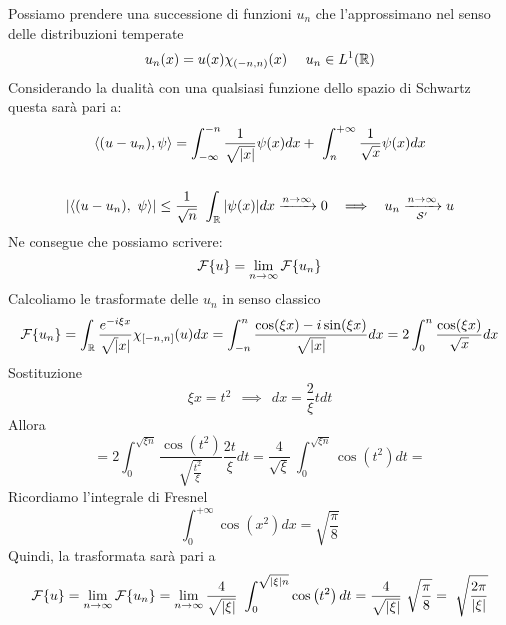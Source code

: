 Possiamo prendere una successione di funzioni $u_{n}$ che l'approssimano nel senso delle distribuzioni temperate
\begin{equation*}
u_{n}(x) = u(x) \chi_{(- n, n)}(x) \ \ \ \ u_{n} \in L^{1} (\mathbb{R})
\end{equation*}
Considerando la dualità con una qualsiasi funzione dello spazio di Schwartz questa sarà pari a:
\begin{gather*}
\langle (u - u_{n}), \psi \rangle = \int^{- n}_{- \infty}\frac{1}{\sqrt{| x|}} \psi (x) dx + \ \int^{+ \infty}_{n}\frac{1}{\sqrt{x}} \psi (x) dx\\
\\
| \langle (u - u_{n}), \ \psi \rangle | \leq \frac{1}{\sqrt{n}} \ \int_{\RR}| \psi (x)| dx\xrightarrow{n\rightarrow \infty} 0\ \ \implies \ \ u_{n}\xrightarrow[\Sc  ']{n\rightarrow \infty} u
\end{gather*}
Ne consegue che possiamo scrivere:
\begin{equation*}
\mathcal{F} \{u\} = \lim_{n\rightarrow \infty}\mathcal{F} \{u_{n}\}
\end{equation*}
Calcoliamo le trasformate delle $u_{n}$ in senso classico
\begin{equation*}
\mathcal{F} \{u_{n}\} = \int_{\mathbb{R}}\frac{e^{- i\xi x}}{\sqrt{|} x|} \chi_{[ - n, n]} (u)dx = \int^{n}_{- n}\frac{\cos(\xi x) - i\sin (\xi x)}{\sqrt{| x|}} dx = 2\int^{n}_{0}\frac{\cos(\xi x)}{\sqrt{x}} dx
\end{equation*}
Sostituzione
\begin{equation*}
\xi x = t^{2} \ \ \implies \ \ dx = \frac{2}{\xi} tdt
\end{equation*}
Allora
\begin{equation*}
= 2\int^{\sqrt{\xi n}}_{0}\frac{\cos\left(t^{2}\right)}{\sqrt{\frac{t^{2}}{\xi}}}\frac{2t}{\xi} dt = \frac{4}{\sqrt{\xi}} \ \int^{\sqrt{\xi n}}_{0}\cos\left(t^{2}\right) dt =
\end{equation*}
Ricordiamo l'integrale di Fresnel
\begin{equation*}
\int^{+ \infty}_{0}\cos\left(x^{2}\right) dx = \sqrt{\frac{\pi}{8}}
\end{equation*}
Quindi, la trasformata sarà pari a
\begin{equation*}
\Fc \{u\} = \lim_{n\rightarrow \infty}\Fc \{u_{n}\} = \lim_{n\rightarrow \infty}\frac{4}{\sqrt{| \xi |}} \ \int^{\sqrt{| \xi | n}}_{0}\cos\left(t^{2}\right) dt = \frac{4}{\sqrt{| \xi |}} \ \sqrt{\frac{\pi}{8}} = \ \sqrt{\frac{2\pi}{| \xi |}}
\end{equation*}
